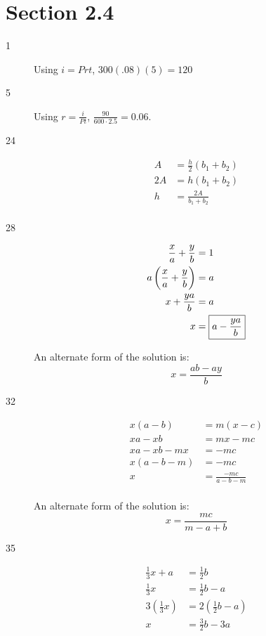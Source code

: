 \documentclass[letterpaper]{exam}
\begin{document}
    \section{Section 2.4} %
    \begin{description}
      
      \item[1] Using $i = Prt$, $300(.08)(5) = \boxed{ 120 }$

      \item[5] Using \(r = \frac{i}{Pt}\), \(\frac{90}{600 \cdot 2.5} = \boxed{ 0.06 } \).

      \item[24]
        \begin{align*}
          A  & = \frac{h}{2} (b_1 + b_2) \\
          2A & = h(b_1 + b_2) \\
          h  & = \frac{2A}{b_1 + b_2} \\
        \end{align*}

      \item[28]
      \begin{align*}
        \frac{x}{a} + \frac{y}{b}           & = 1 \\
        a \del{ \frac{x}{a} + \frac{y}{b} } & = a  \\
        x + \frac{ya}{b}                    & = a  \\
        x                                   & = \boxed{ a - \frac{ya}{b} } \\
      \end{align*}

      An alternate form of the solution is: 
      \[
        \boxed{ x = \frac{ab - ay}{b} } 
      \]

      \item[32]
        \begin{align*}
          x(a-b)   & = m(x-c) \\
          xa-xb    & = mx-mc \\
          xa-xb-mx & = -mc \\
          x(a-b-m) & = -mc \\
          x        & = \frac{-mc}{a-b-m} \\
        \end{align*}

      An alternate form of the solution is: 
      \[
        \boxed{ x = \frac{mc}{m - a + b} } 
      \]

      \item[35]
      \begin{align*}
        \frac{1}{3}x + a & = \frac{1}{2}b \\
        \frac{1}{3}x     & = \frac{1}{2}b - a \\
        3(\frac{1}{3}x)  & = 2(\frac{1}{2}b - a) \\
        x                & = \boxed{ \frac{3}{2}b - 3a } \\
      \end{align*}


\end{description}
\end{document}
